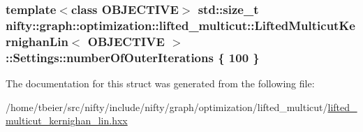 \subsubsection[{number\+Of\+Outer\+Iterations}]{\setlength{\rightskip}{0pt plus 5cm}template$<$class O\+B\+J\+E\+C\+T\+I\+V\+E$>$ std\+::size\+\_\+t {\bf nifty\+::graph\+::optimization\+::lifted\+\_\+multicut\+::\+Lifted\+Multicut\+Kernighan\+Lin}$<$ O\+B\+J\+E\+C\+T\+I\+V\+E $>$\+::Settings\+::number\+Of\+Outer\+Iterations \{ 100 \}}\label{structnifty_1_1graph_1_1optimization_1_1lifted__multicut_1_1LiftedMulticutKernighanLin_1_1Settings_aa207f2cbb74945be916e7594cb41381c}


The documentation for this struct was generated from the following file\+:\begin{DoxyCompactItemize}
\item 
/home/tbeier/src/nifty/include/nifty/graph/optimization/lifted\+\_\+multicut/\hyperlink{lifted__multicut__kernighan__lin_8hxx}{lifted\+\_\+multicut\+\_\+kernighan\+\_\+lin.\+hxx}\end{DoxyCompactItemize}
